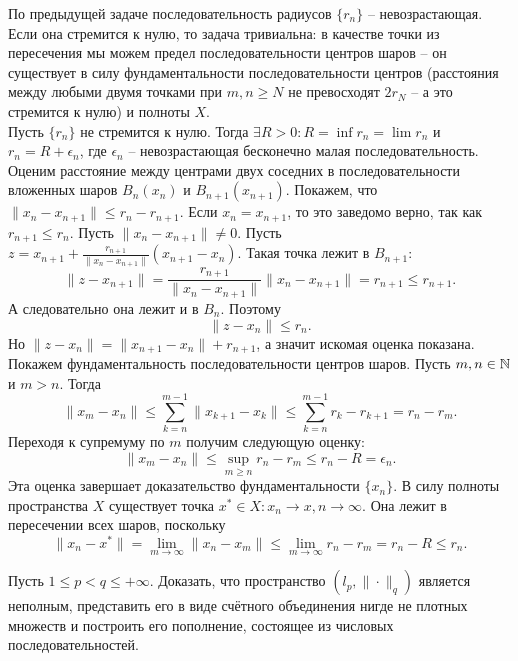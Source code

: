 \begin{solve}
    По предыдущей задаче последовательность радиусов $\{r_n\}$ -- невозрастающая.
    Если она стремится к нулю, то задача тривиальна: в качестве точки из пересечения мы можем предел последовательности центров шаров -- он существует в силу фундаментальности последовательности центров (расстояния между любыми двумя точками при $m, n \geq N$ не превосходят $2r_N$ -- а это стремится к нулю) и полноты $X$. \\
    Пусть $\{r_n\}$ не стремится к нулю. Тогда $\exists R > 0\colon R  = \inf r_n = \lim r_n$ и $r_n = R + \epsilon_n$, где $\epsilon_n$ -- невозрастающая бесконечно малая последовательность.\\
    Оценим расстояние между центрами двух соседних в последовательности вложенных шаров $B_n(x_n)$ и $B_{n + 1}(x_{n + 1})$. Покажем, что $\|x_{n} - x_{n + 1}\| \leq r_n - r_{n + 1}$. Если $x_{n} = x_{n + 1}$, то это заведомо верно, так как $r_{n + 1} \leq r_n$. Пусть $\|x_n - x_{n + 1}\| \neq 0$. Пусть $z = x_{n + 1} + \frac{r_{n + 1}}{\|x_{n } - x_{n + 1}\|}(x_{n + 1} - x_{n})$. Такая точка лежит в $B_{n + 1}\colon$
    \[
        \|z - x_{n + 1}\| = \frac{r_{n + 1}}{\|x_n - x_{n + 1}\|}\|x_n - x_{n + 1}\| = r_{n + 1} \leq r_{n + 1}.
    \]
    А следовательно она лежит и в $B_n$. Поэтому
    \[
        \|z - x_n\| \leq r_n.
    \]
    Но $\|z - x_n\| = \|x_{n + 1} - x_n\| + r_{n + 1}$, а значит искомая оценка показана. \\
    Покажем фундаментальность последовательности центров шаров. Пусть $m, n \in \mathbb{N}$ и $m > n$. Тогда
    \[
        \|x_m - x_n\| \leq \sum\limits_{k = n}^{m - 1} \|x_{k + 1} - x_k\| \leq \sum\limits_{k = n}^{m - 1} r_{k} - r_{k + 1} = r_n - r_m.
    \]
    Переходя к супремуму по $m$ получим следующую оценку:
    \[
        \|x_m - x_n\| \leq \sup\limits_{m \geq n} r_n - r_m \leq r_n - R = \epsilon_n.
    \]
    Эта оценка завершает доказательство фундаментальности $\{x_n\}$. В силу полноты пространства $X$ существует точка $x^* \in X\colon x_n \rightarrow x, n \rightarrow \infty$. Она лежит в пересечении всех шаров, поскольку
    \[
        \|x_n - x^*\| = \lim_{m \rightarrow \infty} \|x_n - x_m\| \leq \lim\limits_{m \rightarrow \infty} r_n - r_m = r_n - R \leq r_n.
    \]
\end{solve}
\begin{task}[T13]
    Пусть $1 \leq p < q \leq +\infty$. Доказать, что пространство $(l_p, \|\cdot\|_q)$ является неполным, представить его в виде счётного объединения нигде не плотных множеств и построить его пополнение, состоящее из числовых последовательностей.
\end{task}
